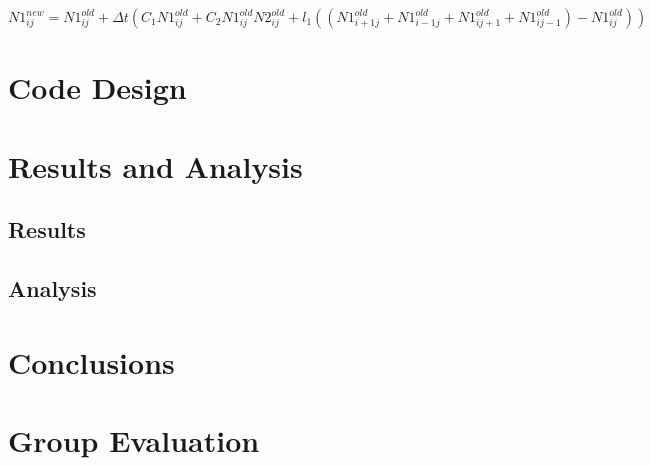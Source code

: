\documentclass[12pt]{report}
\begin{document}
$N1_{ij}^{new}=N1_{ij}^{old} + {\Delta}t(C_{1}N1_{ij}^{old}+C_{2}N1_{ij}^{old}N2_{ij}^{old} + l_{1}((N1_{i+1j}^{old} + N1_{i-1j}^{old} + N1_{ij+1}^{old} + N1_{ij-1}^{old})-N1_{ij}^{old}))$

\chapter{Code Design}

\chapter{Results and Analysis}
\section{Results}
\section{Analysis}

\chapter{Conclusions}

\chapter{Group Evaluation}
\end{document}
